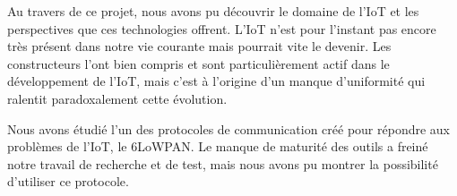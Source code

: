 
Au travers de ce projet, nous avons pu découvrir le domaine de l’IoT et les perspectives que ces technologies offrent.
L’IoT n’est pour l’instant pas encore très présent dans notre vie courante mais pourrait vite le devenir.
Les constructeurs l’ont bien compris et sont particulièrement actif dans le développement de l’IoT, mais c’est à l’origine d’un manque d’uniformité qui ralentit paradoxalement cette évolution.

Nous avons étudié l’un des protocoles de communication créé pour répondre aux problèmes de l’IoT, le 6LoWPAN.
Le manque de maturité des outils a freiné notre travail de recherche et de test, mais nous avons pu montrer la possibilité d’utiliser ce protocole.

% 

